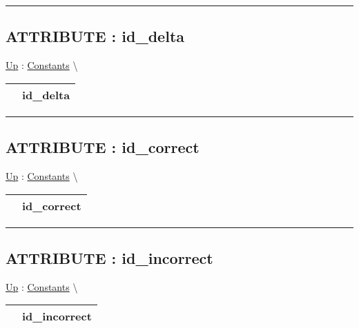 \par


\rule{\linewidth}{0.5pt}
\subsection*{ATTRIBUTE : id\_delta}
\hypertarget{ecldoc:logisticregression.constants.id_delta}{}
\hyperlink{ecldoc:LogisticRegression.Constants}{Up} :
\hspace{0pt} \hyperlink{ecldoc:LogisticRegression.Constants}{Constants} \textbackslash 

{\renewcommand{\arraystretch}{1.5}
\begin{tabularx}{\textwidth}{|>{\raggedright\arraybackslash}l|X|}
\hline
\hspace{0pt} & id\_delta \\
\hline
\end{tabularx}
}

\par


\rule{\linewidth}{0.5pt}
\subsection*{ATTRIBUTE : id\_correct}
\hypertarget{ecldoc:logisticregression.constants.id_correct}{}
\hyperlink{ecldoc:LogisticRegression.Constants}{Up} :
\hspace{0pt} \hyperlink{ecldoc:LogisticRegression.Constants}{Constants} \textbackslash 

{\renewcommand{\arraystretch}{1.5}
\begin{tabularx}{\textwidth}{|>{\raggedright\arraybackslash}l|X|}
\hline
\hspace{0pt} & id\_correct \\
\hline
\end{tabularx}
}

\par


\rule{\linewidth}{0.5pt}
\subsection*{ATTRIBUTE : id\_incorrect}
\hypertarget{ecldoc:logisticregression.constants.id_incorrect}{}
\hyperlink{ecldoc:LogisticRegression.Constants}{Up} :
\hspace{0pt} \hyperlink{ecldoc:LogisticRegression.Constants}{Constants} \textbackslash 

{\renewcommand{\arraystretch}{1.5}
\begin{tabularx}{\textwidth}{|>{\raggedright\arraybackslash}l|X|}
\hline
\hspace{0pt} & id\_incorrect \\
\hline
\end{tabularx}
}

